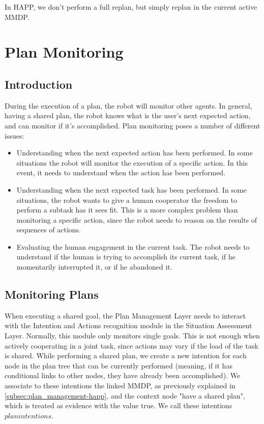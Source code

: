In HAPP, we don't perform a full replan, but simply replan in the current active MMDP. 


\section{Plan Monitoring}
\subsection{Introduction}
During the execution of a plan, the robot will monitor other agents. In general, having a shared plan, the robot knows what is the user's next expected action, and can monitor if it's accomplished. Plan monitoring poses a number of different issues:
\begin{itemize}
\item Understanding when the next expected action has been performed. In some situations the robot will monitor the execution of a specific action. In this event, it needs to understand when the action has been performed.
\item Understanding when the next expected task has been performed. In some situations, the robot wants to give a human cooperator the freedom to perform a subtask has it sees fit. This is a more complex problem than monitoring a specific action, since the robot needs to reason on the results of sequences of actions.
\item Evaluating the human engagement in the current task. The robot needs to understand if the human is trying to accomplish its current task, if he momentarily interrupted it, or if he abandoned it.
\end{itemize}

\subsection{Monitoring Plans}
When executing a shared goal, the Plan Management Layer needs to interact with the Intention and Actions recognition module in the Situation Assessment Layer. Normally, this module only monitors single goals. This is not enough when actively cooperating in a joint task, since actions may vary if the load of the task is shared. While performing a shared plan, we create a new intention for each node in the plan tree that can be currently performed (meaning, if it has conditional links to other nodes, they have already been accomplished). We associate to these intentions the linked MMDP, as previously explained in \ref{subsec:plan_management-happ}, and the context node "have a shared plan", which is treated as evidence with the value true. We call these intentions $plan intentions$.

